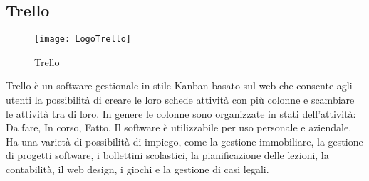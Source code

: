 \subsection{Trello}
\begin{figure}[htpb!]
\center
  \texttt{[image: LogoTrello]}
  \caption{Trello}
\end{figure}
Trello è un software gestionale in stile Kanban basato sul web che consente agli utenti la possibilità di creare le loro schede attività con più colonne e scambiare le attività tra di loro. In genere le colonne sono organizzate in stati dell'attività: Da fare, In corso, Fatto. Il software è utilizzabile per uso personale e aziendale. Ha una varietà di possibilità di impiego, come la gestione immobiliare, la gestione di progetti software, i bollettini scolastici, la pianificazione delle lezioni, la contabilità, il web design, i giochi e la gestione di casi legali.
